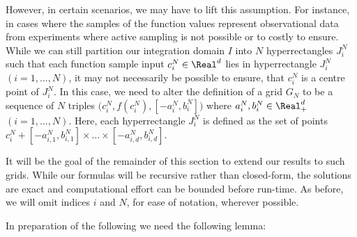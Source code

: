 However, in certain scenarios, we may have to lift this assumption. For instance, in cases where the samples of the function values represent observational data from experiments where active sampling is not possible or to costly to ensure. 
While we can still partition our integration domain $I$ into $N$ hyperrectangles $J_i^N$   such that each function sample input $c_i^N \in \Real^d$ lies in hyperrectangle $J_i^N$ $(i=1,...,N)$, it may not necessarily be possible to ensure, that $c_i^N$ is a centre point of $J_i^N$. In this case, we need to alter the definition of a grid $G_N$ to be a sequence of $N$ triples $\bigl(c_i^N,f(c_i^N), [-a_i^N,b_i^N]\bigr)$ where $a_i^N,b_i^N \in  \Real_+^d$  $(i=1,...,N)$. Here, each hyperrectangle $J_i^N$ is defined as the set of points 
$c_i^N + [-a_{i,1}^N,b_{i,1}^N] \times \ldots \times [-a_{i,d}^N,b_{i,d}^N]$. 

It will be the goal of the remainder of this section to extend our results to such grids. While our formulas will be recursive rather than closed-form, the solutions are exact and computational effort can be bounded before run-time.
As before, we will omit indices $i$ and $N$, for ease of notation, wherever possible.

In preparation of the following we need the following lemma:

